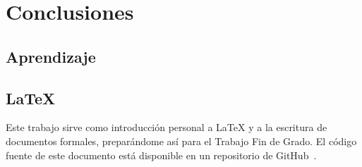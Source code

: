 \chapter{Conclusiones}
\section{Aprendizaje}

\section{\LaTeX}
Este trabajo sirve como introducción personal a \LaTeX{} y a la escritura de documentos formales, preparándome así para el Trabajo Fin de Grado.
El código fuente de este documento está disponible en un repositorio de GitHub~\cite{source}.
